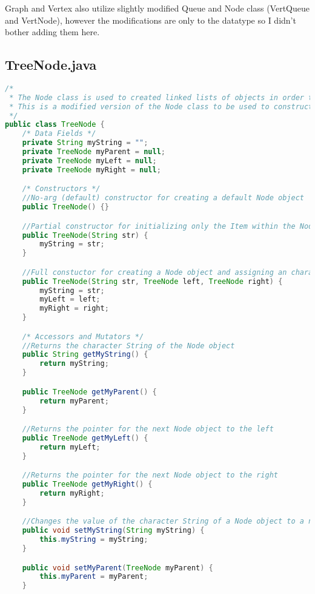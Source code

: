 \documentclass[letterpaper, 10pt,DIV=13]{scrartcl}
\numberwithin{equation}{section} %
\numberwithin{figure}{section} %
\numberwithin{table}{section} %
\begin{document}
Graph and Vertex also utilize slightly modified Queue and Node class (VertQueue and VertNode), however the modifications are only to the datatype so I didn't bother adding them here.

\subsection{TreeNode.java}
\begin{lstlisting}[frame=single, language=java, breaklines]  
/*
 * The Node class is used to created linked lists of objects in order to more variably control the size of said list without being locked into an array
 * This is a modified version of the Node class to be used to construct binary trees.
 */
public class TreeNode {
    /* Data Fields */
    private String myString = "";
    private TreeNode myParent = null;
    private TreeNode myLeft = null;
    private TreeNode myRight = null;

    /* Constructors */
    //No-arg (default) constructor for creating a default Node object
    public TreeNode() {}

    //Partial constructor for initializing only the Item within the Node
    public TreeNode(String str) {
        myString = str;
    }

    //Full constuctor for creating a Node object and assigning an character name and next Node object pointer for left and right
    public TreeNode(String str, TreeNode left, TreeNode right) {
        myString = str;
        myLeft = left;
        myRight = right;
    }

    /* Accessors and Mutators */
    //Returns the character String of the Node object
    public String getMyString() {
        return myString;
    }

    public TreeNode getMyParent() {
        return myParent;
    }

    //Returns the pointer for the next Node object to the left
    public TreeNode getMyLeft() {
        return myLeft;
    }

    //Returns the pointer for the next Node object to the right
    public TreeNode getMyRight() {
        return myRight;
    }

    //Changes the value of the character String of a Node object to a new String
    public void setMyString(String myString) {
        this.myString = myString;
    }

    public void setMyParent(TreeNode myParent) {
        this.myParent = myParent;
    }


\end{lstlisting}
\end{document}
